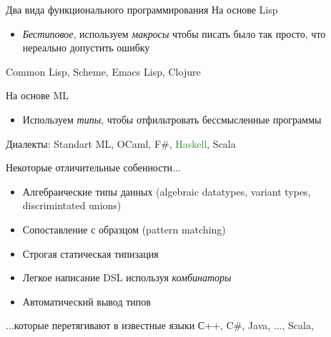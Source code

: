 \documentclass{beamer}
\def\faQuestion{{\FA\symbol{"F128}}}
\def\faExclamation{{\FA\symbol{"F12A}}}
\begin{document}
\begin{frame}{Два вида функционального программирования}
На основе Lisp
\begin{itemize}
 \item \emph{Бестиповое}, используем \emph{макросы} чтобы писать было так просто, что нереально допустить ошибку
\end{itemize}
\vspace{0.5cm}
Common Lisp, Scheme, Emacs Lisp, Clojure

\vspace{1cm}\pause
На основе ML
\begin{itemize}
 \item Используем \emph{типы}, чтобы отфильтровать бессмысленные программы
\end{itemize}
\vspace{0.5cm}
Диалекты: Standart ML, OCaml, F\#, \textcolor{ForestGreen}{Haskell}, Scala
\end{frame}

\begin{frame}{Некоторые отличительные собенности...}
\begin{itemize}
 \item Алгебраические типы данных (algebraic datatypes, variant types, discrimintated unions)
 \item Сопоставление с образцом (pattern matching)
 \item Строгая статическая типизация
 \item Легкое  написание DSL используя \emph{комбинаторы}
 \item Автоматический вывод типов
\end{itemize}
\end{frame}

\begin{frame}{...которые перетягивают в известные языки}
С++, C\#, Java, ..., Scala\faQuestion \faExclamation,
\\
\end{frame}
\end{document}

